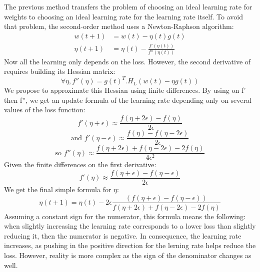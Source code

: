 \documentclass{article}
\begin{document}
  The previous method transfers the problem of choosing an ideal learning rate for weights to choosing an ideal learning rate for the learning rate itself. To avoid that problem, the second-order method uses a Newton-Raphson algorithm:\\
  \begin{align}  
  w(t+1) &= w(t) -\eta(t)g(t)\\
  \eta(t+1) &= \eta(t) - \frac{f'(\eta(t))}{f''(\eta(t))}
  \end{align}
  Now all the learning only depends on the loss. However, the second derivative of requires building its Hessian matrix:\\
  \begin{equation}
  \forall \eta, f''(\eta) = g(t)^{T}.H_{L}(w(t)-\eta g(t))
  \end{equation}
  We propose to approximate this Hessian using finite differences. By using on f' then f'', we get an update formula of the learning rate depending only on several values of the loss function:\\
  \begin{equation}
  f'(\eta+\epsilon) \approx \frac{f(\eta + 2\epsilon)-f(\eta)}{2\epsilon}
  \end{equation}
  \begin{equation}
  \text{and }f'(\eta-\epsilon) \approx \frac{f(\eta)-f(\eta-2\epsilon)}{2\epsilon}
  \end{equation}  
  \begin{equation}
  \text{so }f''(\eta) \approx \frac{f(\eta+2\epsilon)+f(\eta-2\epsilon)-2f(\eta)}{4 \epsilon^{2}}
  \end{equation}
  Given the finite differences on the first derivative:\\    
  \begin{equation}
  f'(\eta) \approx \frac{f(\eta+\epsilon)-f(\eta-\epsilon)}{2 \epsilon}
  \end{equation}
  We get the final simple formula for $\eta$:\\
  \begin{equation}
  \eta(t+1) = \eta(t) - 2\epsilon\frac{(f(\eta+\epsilon)-f(\eta-\epsilon))}{f(\eta+2\epsilon)+f(\eta-2\epsilon)-2f(\eta)}
  \end{equation}    
  Assuming a constant sign for the numerator, this formula means the following: when slightly increasing the learning rate corresponds to a lower loss than slightly reducing it, then the numerator is negative. In consequence, the learning rate increases, as pushing in the positive direction for the lerning rate helps reduce the loss. However, reality is more complex as the sign of the denominator changes as well. 
  
\end{document}
